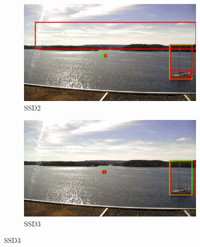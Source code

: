 \begin{figure}
\begin{subfigure}{.5\textwidth}
  \centering
  \includegraphics[width=0.9\linewidth]{results/case_buildings/bigbox_bcbf/SSD2/selected_08_07_frame2176.jpg}
  \caption{SSD2}
  \label{fig:sfig1}
\end{subfigure}%
\begin{subfigure}{.5\textwidth}
  \centering
  \includegraphics[width=.9\linewidth]{results/case_buildings/bigbox_bcbf/SSD3/selected_08_07_frame2176.jpg}
  \caption{SSD3}
  \label{fig:sfig2}
\end{subfigure}


\end{figure}
